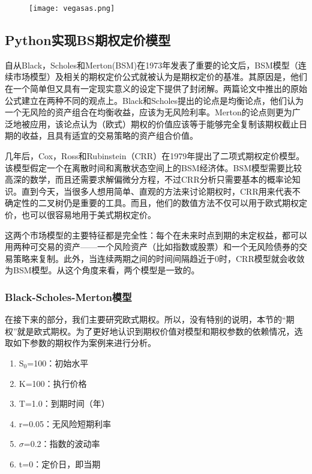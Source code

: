 	
	
	
	\begin{figure}[htb] %
		\centering
		\texttt{[image: vegasas.png]}
		\label{fig:xfig1}
	\end{figure}
	
	
	
	
	
\clearpage		
\subsection{Python实现BS期权定价模型}
	自从Black，Scholes和Merton(BSM)在1973年发表了重要的论文后，BSM模型（连续市场模型）及相关的期权定价公式就被认为是期权定价的基准。其原因是，他们在一个简单但又具有一定现实意义的设定下提供了封闭解。两篇论文中推出的原始公式建立在两种不同的观点上。Black和Scholes提出的论点是均衡论点，他们认为一个无风险的资产组合在均衡收益，应该为无风险利率。Merton的论点则更为广泛地被应用，该论点认为（欧式）期权的价值应该等于能够完全复制该期权截止日期的收益，且具有适宜的交易策略的资产组合价值。

	几年后，Cox，Ross和Rubinstein（CRR）在1979年提出了二项式期权定价模型。该模型假定一个在离散时间和离散状态空间上的BSM经济体。BSM模型需要比较高深的数学，而且还需要求解偏微分方程，不过CRR分析只需要基本的概率论知识。直到今天，当很多人想用简单、直观的方法来讨论期权时，CRR用来代表不确定性的二叉树仍是重要的工具。而且，他们的数值方法不仅可以用于欧式期权定价，也可以很容易地用于美式期权定价。
	
	这两个市场模型的主要特征都是完全性：每个在未来时点到期的未定权益，都可以用两种可交易的资产——一个风险资产（比如指数或股票）和一个无风险债券的交易策略来复制。此外，当连续两期之间的时间间隔趋近于0时，CRR模型就会收敛为BSM模型。从这个角度来看，两个模型是一致的。

\subsubsection{Black-Scholes-Merton模型}
	在接下来的部分，我们主要研究欧式期权。所以，没有特别的说明，本节的“期权”就是欧式期权。为了更好地认识到期权价值对模型和期权参数的依赖情况，选取如下参数的期权作为案例来进行分析。
	
	\begin{enumerate}
		\item S$_{0}$=100：初始水平
		\item K=100：执行价格
		\item T=1.0：到期时间（年）
		\item r=0.05：无风险短期利率
		\item $\sigma$=0.2：指数的波动率
		\item t=0：定价日，即当期
	\end{enumerate}
	

